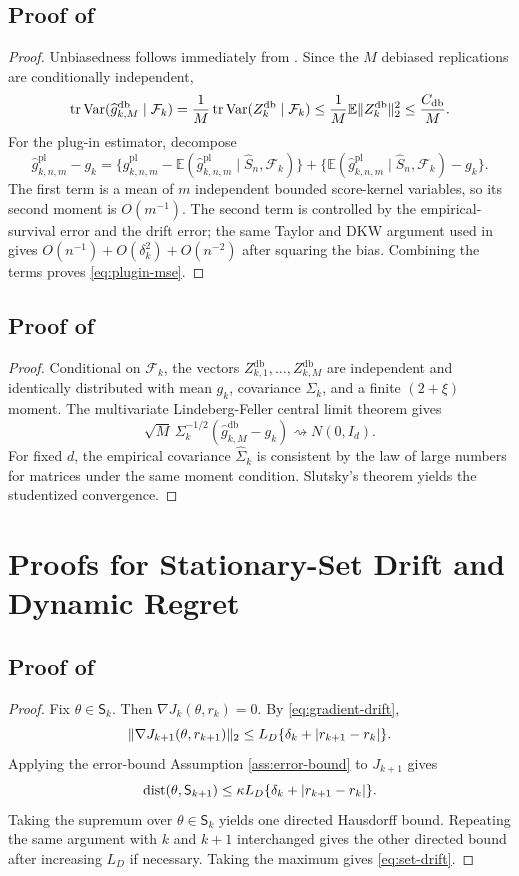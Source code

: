 \documentclass[11pt]{article}
\newcommand{\E}{\mathbb E}
\newcommand{\Var}{\operatorname{Var}}
\newcommand{\1}{\mathbf 1}
\newcommand{\tr}{\operatorname{tr}}
\newcommand{\dist}{\operatorname{dist}}
\DeclarePairedDelimiter{\abs}{\lvert}{\rvert}
\DeclarePairedDelimiter{\norm}{\lVert}{\rVert}
\newcommand{\cF}{\mathcal F}
\newcommand{\Sta}{\mathsf S}
\newcommand{\db}{\mathrm{db}}
\newcommand{\pl}{\mathrm{pl}}
\begin{document}
\subsection{Proof of }
\begin{proof}
Unbiasedness follows immediately from .  Since the $M$ debiased replications are conditionally independent,
\[
 \tr\Var(\widehat g_{k,M}^{\db}\mid\cF_k)
 ={1\over M}\tr\Var(Z_k^{\db}\mid\cF_k)
 \le {1\over M}\E\norm{Z_k^{\db}}_2^2
 \le {C_{\db}\over M}.
\]
For the plug-in estimator, decompose
\[
 \widehat g_{k,n,m}^{\pl}-g_k
 =\{\widehat g_{k,n,m}^{\pl}-\E(\widehat g_{k,n,m}^{\pl}\mid\widehat S_n,\cF_k)\}
 +\{\E(\widehat g_{k,n,m}^{\pl}\mid\widehat S_n,\cF_k)-g_k\}.
\]
The first term is a mean of $m$ independent bounded score-kernel variables, so its second moment is $O(m^{-1})$.  The second term is controlled by the empirical-survival error and the drift error; the same Taylor and DKW argument used in  gives $O(n^{-1})+O(\delta_k^2)+O(n^{-2})$ after squaring the bias.  Combining the terms proves \eqref{eq:plugin-mse}.
\end{proof}

\subsection{Proof of }
\begin{proof}
Conditional on $\cF_k$, the vectors $Z_{k,1}^{\db},\ldots,Z_{k,M}^{\db}$ are independent and identically distributed with mean $g_k$, covariance $\Sigma_k$, and a finite $(2+\xi)$ moment.  The multivariate Lindeberg-Feller central limit theorem gives
\[
 \sqrt{M}\,\Sigma_k^{-1/2}(\widehat g_{k,M}^{\db}-g_k)\rightsquigarrow N(0,I_d).
\]
For fixed $d$, the empirical covariance $\widehat\Sigma_k$ is consistent by the law of large numbers for matrices under the same moment condition.  Slutsky's theorem yields the studentized convergence.
\end{proof}

\section{Proofs for Stationary-Set Drift and Dynamic Regret}\label{app:regret-proofs}

\subsection{Proof of }
\begin{proof}
Fix $\theta\in\Sta_k$.  Then $\nabla J_k(\theta,r_k)=0$.  By \eqref{eq:gradient-drift},
\[
 \norm{\nabla J_{k+1}(\theta,r_{k+1})}_2
 \le L_D\{\delta_k+\abs{r_{k+1}-r_k}\}.
\]
Applying the error-bound Assumption \ref{ass:error-bound} to $J_{k+1}$ gives
\[
 \dist(\theta,\Sta_{k+1})
 \le \kappa L_D\{\delta_k+\abs{r_{k+1}-r_k}\}.
\]
Taking the supremum over $\theta\in\Sta_k$ yields one directed Hausdorff bound.  Repeating the same argument with $k$ and $k+1$ interchanged gives the other directed bound after increasing $L_D$ if necessary.  Taking the maximum gives \eqref{eq:set-drift}.
\end{proof}
\end{document}
